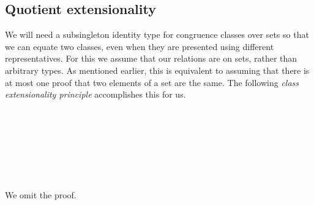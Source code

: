 \documentclass[a4paper,UKenglish,cleveref,autoref,thm-restate]{lipics-v2021}
\begin{document}
\subsection{Quotient extensionality}\label{ssec:quotient-extensionality}
We will need a subsingleton identity type for congruence classes over sets so that we can equate two classes, even when they are presented using different representatives. For this we assume that our relations are on sets, rather than arbitrary types. As mentioned earlier, this is equivalent to assuming that there is at most one proof that two elements of a set are the same.  The following \emph{class extensionality principle} accomplishes this for us.
\ccpad
\begin{code}%
\>[1]\AgdaSpace{}%
\AgdaSymbol{:}%
\>[200I]\AgdaSpace{}%
\AgdaSpace{}%
\AgdaSpace{}%
\<%
\\
\>[1][@{}l@{\AgdaIndent{0}}]%
\>[2]%
\>[.][@{}l@{}]\<[200I]%
\>[14]\AgdaSymbol{\{}\AgdaSpace{}%
\AgdaSymbol{:}\AgdaSpace{}%
\AgdaSpace{}%
\AgdaSymbol{\}\{}\AgdaSpace{}%
\AgdaSpace{}%
\AgdaSymbol{:}\AgdaSpace{}%
\AgdaSymbol{\}\{}\AgdaSpace{}%
\AgdaSymbol{:}\AgdaSpace{}%
\AgdaSpace{}%
\AgdaSpace{}%
\AgdaSymbol{\}}\<%
\\
\>[2]%
\>[14]\AgdaSpace{}%
\AgdaSpace{}%
\AgdaSpace{}%
\AgdaSpace{}%
\AgdaSpace{}%
\AgdaSymbol{(}\AgdaSpace{}%
\AgdaSpace{}%
\AgdaSymbol{))}\<%
\\
\>[2]%
\>[14]\AgdaSpace{}%
\AgdaSpace{}%
\AgdaSpace{}%
\AgdaSpace{}%
\AgdaSymbol{(}\AgdaSpace{}%
\AgdaSymbol{))}\<%
\\
\>[2]%
\>[14]\AgdaSpace{}%
\<%
\\
\>[14]\AgdaComment{---------------------------------------}\<%
\\
%
\>[2]%
\>[14]\AgdaSpace{}%
\AgdaSpace{}%
\AgdaSpace{}%
\AgdaSpace{}%
\AgdaSymbol{(}\AgdaSpace{}%
\AgdaSpace{}%
\AgdaSpace{}%
\AgdaSymbol{\{}\AgdaSymbol{\})}\AgdaSpace{}%
\AgdaSpace{}%
\AgdaSymbol{(}\AgdaSpace{}%
\AgdaSpace{}%
\AgdaSpace{}%
\AgdaSymbol{\{}\AgdaSymbol{\})}\<%
\end{code}
\ccpad
We omit the proof. \seedocfordetails
\end{document}
